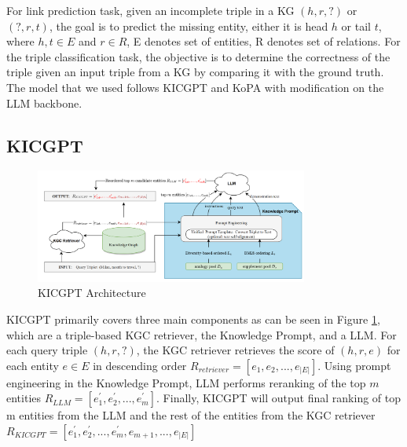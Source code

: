 \documentclass[12pt,a4paper]{article}
\begin{document}

For link prediction task, given an incomplete triple in a KG \((h, r, ?)\) or \((?, r, t)\),
the goal is to predict the missing entity, either it is head \(h\)
or tail \(t\), where \(h, t \in E\) and \(r \in R\), E denotes set of
entities, R denotes set of relations. For the triple classification task,
the objective is to determine the correctness of the triple given an input
triple from a KG by comparing it with the ground truth.
The model that we used follows
KICGPT \cite{wei2023kicgpt} and KoPA \cite{qin2023kopa} with modification on the LLM backbone.

\subsection{KICGPT}
\label{sec:method:kicgpt}


\begin{figure}
    \centering
    \includegraphics[width=0.8\textwidth]{figures/arc3.png}
    \caption{KICGPT Architecture \cite{wei2023kicgpt}}
    \label{fig:KICGPTarchitecture}
\end{figure}

KICGPT primarily covers three main components as can be seen in Figure
\ref{fig:KICGPTarchitecture}, which are a triple-based KGC retriever,
the Knowledge Prompt, and a LLM. For each query triple \((h, r, ?)\),
the KGC retriever retrieves the score of \((h, r, e)\) for each entity
\(e \in E\) in descending order
\(R_{retriever} = [e_1, e_2, ..., e_{|E|}]\).
Using prompt engineering in the Knowledge Prompt, LLM performs reranking
of the top \(m\) entities
\(R_{LLM} = [e^{'}_1, e^{'}_2, ..., e^{'}_m]\). Finally, KICGPT will
output final ranking of top m entities from the LLM and the rest of
the entities from the KGC retriever
\(R_{KICGPT} = [e^{'}_1, e^{'}_2, ..., e^{'}_m, e_{m+1}, ..., e_{|E|}]\)
\end{document}
